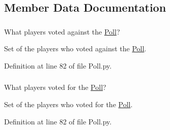 \subsection{\-Member \-Data \-Documentation}
\hypertarget{class_poll_1_1_poll_a5163f62ef55bcd78348edc7b0689c2ce}{
\subsubsection[{\-\_\-\-\_\-players\-\_\-voted\-\_\-no}]{}}
\label{class_poll_1_1_poll_a5163f62ef55bcd78348edc7b0689c2ce}


\-What players voted against the \hyperlink{class_poll_1_1_poll}{\-Poll}? 

\-Set of the players who voted against the \hyperlink{class_poll_1_1_poll}{\-Poll}. 

\-Definition at line 82 of file \-Poll.\-py.

\hypertarget{class_poll_1_1_poll_abec0d453364a9368692794bbb2c9bc0e}{
\subsubsection[{\-\_\-\-\_\-players\-\_\-voted\-\_\-yes}]{}}
\label{class_poll_1_1_poll_abec0d453364a9368692794bbb2c9bc0e}


\-What players voted for the \hyperlink{class_poll_1_1_poll}{\-Poll}? 

\-Set of the players who voted for the \hyperlink{class_poll_1_1_poll}{\-Poll}. 

\-Definition at line 82 of file \-Poll.\-py.

\hypertarget{class_poll_1_1_poll_a94dd36f9a7715b95458df8e87aa5debc}{
\subsubsection[{action}]{}}
\label{class_poll_1_1_poll_a94dd36f9a7715b95458df8e87aa5debc}


